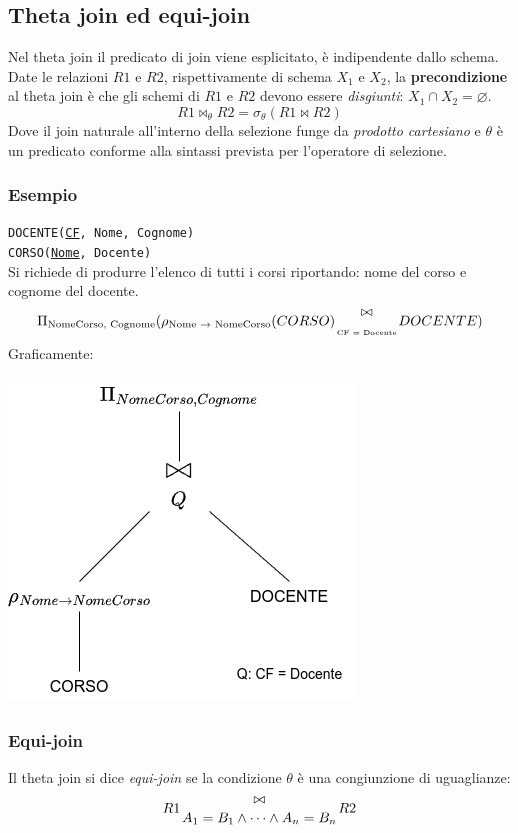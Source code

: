 \documentclass{report}
\begin{document}
\subsection{Theta join ed equi-join}
Nel theta join il predicato di join viene esplicitato, \`e indipendente dallo schema.
Date le relazioni $R1$ e $R2$, rispettivamente di schema $X_1$ e $X_2$, la \textbf{precondizione} al theta join \`e che gli schemi di $R1$ e $R2$ devono essere \emph{disgiunti}: $X_1 \cap X_2 = \varnothing $.
\[ R1 \bowtie_{\theta} R2 = \sigma_{\theta}(R1 \bowtie R2) \]
Dove il join naturale all'interno della selezione funge da \emph{prodotto cartesiano} e $\theta$ \`e un predicato conforme alla sintassi prevista per l'operatore di selezione.
\subsubsection{Esempio}
\texttt{DOCENTE(\underline{CF}, Nome, Cognome)\\
CORSO(\underline{Nome}, Docente)\\
}
Si richiede di produrre l'elenco di tutti i corsi riportando: nome del corso e cognome del docente.
\[ \Pi_{\text{NomeCorso, Cognome}}(\rho_{\text{Nome $\to$ NomeCorso}}(CORSO) {\Large \bowtie \atop \text{\tiny{CF = Docente}}} DOCENTE) \]
Graficamente:
\begin{center}
\includegraphics[scale=0.5]{theta_join_example}
\end{center}

\subsubsection{Equi-join}
Il theta join si dice \emph{equi-join} se la condizione $\theta$ \`e una congiunzione di uguaglianze:
\[ R1 {\bowtie \atop A_1 = B_1 \wedge \dots \wedge A_n = B_n} R2 \]
\end{document}
